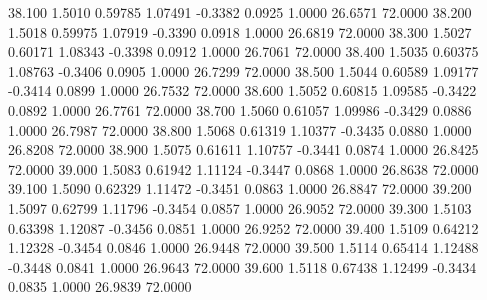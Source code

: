   38.100   1.5010   0.59785   1.07491  -0.3382   0.0925   1.0000  26.6571  72.0000
  38.200   1.5018   0.59975   1.07919  -0.3390   0.0918   1.0000  26.6819  72.0000
  38.300   1.5027   0.60171   1.08343  -0.3398   0.0912   1.0000  26.7061  72.0000
  38.400   1.5035   0.60375   1.08763  -0.3406   0.0905   1.0000  26.7299  72.0000
  38.500   1.5044   0.60589   1.09177  -0.3414   0.0899   1.0000  26.7532  72.0000
  38.600   1.5052   0.60815   1.09585  -0.3422   0.0892   1.0000  26.7761  72.0000
  38.700   1.5060   0.61057   1.09986  -0.3429   0.0886   1.0000  26.7987  72.0000
  38.800   1.5068   0.61319   1.10377  -0.3435   0.0880   1.0000  26.8208  72.0000
  38.900   1.5075   0.61611   1.10757  -0.3441   0.0874   1.0000  26.8425  72.0000
  39.000   1.5083   0.61942   1.11124  -0.3447   0.0868   1.0000  26.8638  72.0000
  39.100   1.5090   0.62329   1.11472  -0.3451   0.0863   1.0000  26.8847  72.0000
  39.200   1.5097   0.62799   1.11796  -0.3454   0.0857   1.0000  26.9052  72.0000
  39.300   1.5103   0.63398   1.12087  -0.3456   0.0851   1.0000  26.9252  72.0000
  39.400   1.5109   0.64212   1.12328  -0.3454   0.0846   1.0000  26.9448  72.0000
  39.500   1.5114   0.65414   1.12488  -0.3448   0.0841   1.0000  26.9643  72.0000
  39.600   1.5118   0.67438   1.12499  -0.3434   0.0835   1.0000  26.9839  72.0000
